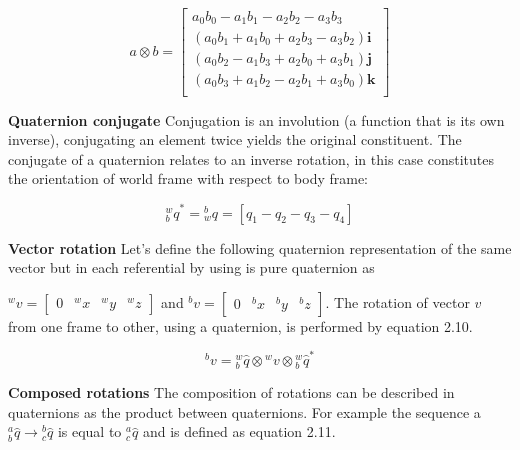 \begin{equation}
    a \otimes b =
    \begin{bmatrix}
        a_0 b_0 - a_1 b_1 - a_2 b_2 - a_3 b_3                 \\
        (a_0 b_1 + a_1 b_0 + a_2 b_3 - a_3 b_2)\boldsymbol{i} \\
        (a_0 b_2 - a_1 b_3 + a_2 b_0 + a_3 b_1)\boldsymbol{j} \\
        (a_0 b_3 + a_1 b_2 - a_2 b_1 + a_3 b_0)\boldsymbol{k} \\
    \end{bmatrix}
    \label{eq:quaternion_matrix}
\end{equation}

\item \textbf{Quaternion conjugate} Conjugation is an involution (a function that is its own inverse), conjugating an element twice yields the original constituent. The conjugate of a quaternion relates to an inverse rotation, in this case constitutes the orientation of world frame with respect to body frame:

\begin{equation}
    \textrm{$_{b}^{w}q$}^* =\textrm{$_{w}^{b}q$} = \left[q_1 - q_2 - q_3 - q_4\right]
\end{equation}

\item \textbf{Vector rotation} Let’s define the following quaternion representation of the same vector but in each referential by using is pure quaternion as

$ ^wv = \begin{bmatrix}
        0 & ^wx & ^wy & ^wz
    \end{bmatrix} $
and
$^bv = \begin{bmatrix}
        0 & ^bx & ^by & ^bz
    \end{bmatrix} $. The rotation of vector $v$ from one frame to other, using a quaternion, is performed by equation 2.10.

\begin{equation}
    \textrm{$^{b}v$} = \textrm{$_{b}^{w}\hat{q}$} \otimes \textrm{$^{w}v$} \otimes \textrm{$_{b}^{w}\hat{q}$}^*
\end{equation}

\item \textbf{Composed rotations} The composition of rotations can be described in quaternions as the product between quaternions. For example the sequence a $^a_b\hat{q} \rightarrow {^b_c\hat{q}}$ is equal to $^a_c{\hat{q}}$ and is defined as equation 2.11.


